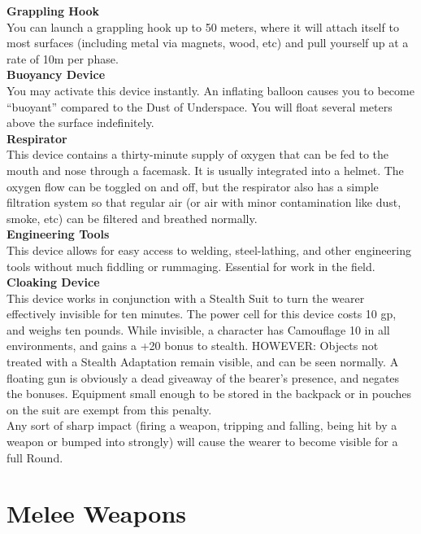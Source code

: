 \documentclass[a4paper, twocolumn, openany]{book}
\begin{document}
{{\bfseries Grappling Hook\\}
You can launch a grappling hook up to 50 meters, where it will attach itself to most surfaces
(including metal via magnets, wood, etc) and pull yourself up at a rate of 10m per phase.\\

{\bfseries Buoyancy Device\\}
You may activate this device instantly. An inflating balloon causes you to become “buoyant”
compared to the Dust of Underspace. You will float several meters above the surface
indefinitely.\\

{\bfseries Respirator\\}
This device contains a thirty-minute supply of oxygen that can be fed to the mouth and nose
through a facemask. It is usually integrated into a helmet. The oxygen flow can be toggled on
and off, but the respirator also has a simple filtration system so that regular air (or air with minor
contamination like dust, smoke, etc) can be filtered and breathed normally.\\

{\bfseries Engineering Tools\\}
This device allows for easy access to welding, steel-lathing, and other engineering tools without
much fiddling or rummaging. Essential for work in the field.\\

{\bfseries Cloaking Device\\}
This device works in conjunction with a Stealth Suit to turn the wearer effectively invisible for ten
minutes. The power cell for this device costs 10 gp, and weighs ten pounds. While invisible, a
character has Camouflage 10 in all environments, and gains a +20 bonus to stealth.
HOWEVER: Objects not treated with a Stealth Adaptation remain visible, and can be seen
normally. A floating gun is obviously a dead giveaway of the bearer’s presence, and negates the
bonuses. Equipment small enough to be stored in the backpack or in pouches on the suit are
exempt from this penalty.\\
Any sort of sharp impact (firing a weapon, tripping and falling, being hit by a weapon or bumped
into strongly) will cause the wearer to become visible for a full Round.\\

\section{Melee Weapons}

}
\end{document}
